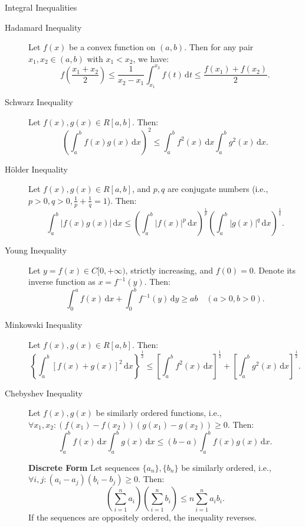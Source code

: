 \documentclass[11pt]{../../TexTemplate/elegantbook}
\begin{document}
\begin{theorem}{Integral Inequalities}
    \begin{description}
        \item[Hadamard Inequality] Let \( f(x) \) be a convex function on \( (a, b) \). 
            Then for any pair \( x_1, x_2 \in (a, b) \) with \( x_1 < x_2 \), we have:
            \[
            f\left( \frac{x_1 + x_2}{2} \right) \leqslant \frac{1}{x_2 - x_1} \int_{x_1}^{x_2} f(t) \, \mathrm{d}t \leqslant \frac{f(x_1) + f(x_2)}{2}.
            \]

        \item[Schwarz Inequality] Let \( f(x), g(x) \in R[a, b] \). Then:
            \[
            \left( \int_{a}^{b} f(x)g(x) \, \mathrm{d}x \right)^2 \leqslant \int_{a}^{b} f^2(x) \, \mathrm{d}x \int_{a}^{b} g^2(x) \, \mathrm{d}x.
            \]

        \item[Hölder Inequality] Let \( f(x), g(x) \in R[a, b] \), and \( p, q \) are conjugate numbers 
            (i.e., \( p > 0, q > 0, \frac{1}{p} + \frac{1}{q} = 1 \)). Then:
            \[
            \int_{a}^{b} |f(x)g(x)| \, \mathrm{d}x \leqslant \left( \int_{a}^{b} |f(x)|^p \, \mathrm{d}x \right)^{\frac{1}{p}} \left( \int_{a}^{b} |g(x)|^q \, \mathrm{d}x \right)^{\frac{1}{q}}.
            \]

        \item[Young Inequality] Let \( y = f(x) \in C[0, +\infty) \), strictly increasing, 
            and \( f(0) = 0 \). Denote its inverse function as \( x = f^{-1}(y) \). Then:
            \[
            \int_{0}^{a} f(x) \, \mathrm{d}x + \int_{0}^{b} f^{-1}(y) \, \mathrm{d}y \geqslant ab \quad (a > 0, b > 0).
            \]

        \item[Minkowski Inequality] Let \( f(x), g(x) \in R[a, b] \). Then:
            \[
            \left\{ \int_{a}^{b} [f(x) + g(x)]^2 \, \mathrm{d}x \right\}^{\frac{1}{2}} \leqslant \left[ \int_{a}^{b} f^2(x) \, \mathrm{d}x \right]^{\frac{1}{2}} + \left[ \int_{a}^{b} g^2(x) \, \mathrm{d}x \right]^{\frac{1}{2}}.
            \]

        \item[Chebyshev Inequality] Let \( f(x), g(x) \) be similarly ordered functions, 
                i.e., \( \forall x_1, x_2: (f(x_1) - f(x_2))(g(x_1) - g(x_2)) \geqslant 0 \). Then:
                \[
                \int_{a}^{b} f(x) \, \mathrm{d}x \int_{a}^{b} g(x) \, \mathrm{d}x \leqslant (b - a) \int_{a}^{b} f(x)g(x) \, \mathrm{d}x.
                \]

            \textbf{Discrete Form} Let sequences \( \{a_n\}, \{b_n\} \) be similarly ordered, 
                i.e., \( \forall i, j: (a_i - a_j)(b_i - b_j) \geqslant 0 \). Then:
                \[
                \left( \sum\limits_{i=1}^{n} a_i \right) \left( \sum\limits_{i=1}^{n} b_i \right) \leqslant n \sum\limits_{i=1}^{n} a_i b_i.
                \]
            If the sequences are oppositely ordered, the inequality reverses.
    \end{description}
\end{theorem}
\end{document}
